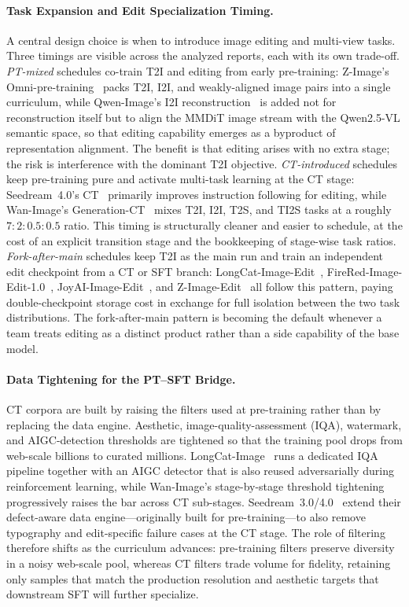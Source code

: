 \documentclass{llmxive}
\begin{document}
\paragraph{Task Expansion and Edit Specialization Timing.}
{A central design choice is when to introduce image editing and multi-view tasks. Three timings are visible across the analyzed reports, each with its own trade-off. \textit{PT-mixed} schedules co-train T2I and editing from early pre-training: Z-Image's Omni-pre-training~\citep{cai2025z} packs T2I, I2I, and weakly-aligned image pairs into a single curriculum, while Qwen-Image's I2I reconstruction~\citep{wu2025qwen} is added not for reconstruction itself but to align the MMDiT image stream with the Qwen2.5-VL semantic space, so that editing capability emerges as a byproduct of representation alignment. The benefit is that editing arises with no extra stage; the risk is interference with the dominant T2I objective. \textit{CT-introduced} schedules keep pre-training pure and activate multi-task learning at the CT stage: Seedream~4.0's CT~\citep{seedream2025seedream} primarily improves instruction following for editing, while Wan-Image's Generation-CT~\citep{mao2026wan} mixes T2I, I2I, T2S, and TI2S tasks at a roughly $7{:}2{:}0.5{:}0.5$ ratio. This timing is structurally cleaner and easier to schedule, at the cost of an explicit transition stage and the bookkeeping of stage-wise task ratios. \textit{Fork-after-main} schedules keep T2I as the main run and train an independent edit checkpoint from a CT or SFT branch: LongCat-Image-Edit~\citep{team2025longcat}, FireRed-Image-Edit-1.0~\citep{team2026firered}, JoyAI-Image-Edit~\citep{jdjoyaiimage}, and Z-Image-Edit~\citep{cai2025z} all follow this pattern, paying double-checkpoint storage cost in exchange for full isolation between the two task distributions. The fork-after-main pattern is becoming the default whenever a team treats editing as a distinct product rather than a side capability of the base model.}

\paragraph{Data Tightening for the PT--SFT Bridge.}
{CT corpora are built by raising the filters used at pre-training rather than by replacing the data engine. Aesthetic, image-quality-assessment (IQA), watermark, and AIGC-detection thresholds are tightened so that the training pool drops from web-scale billions to curated millions. LongCat-Image~\citep{team2025longcat} runs a dedicated IQA pipeline together with an AIGC detector that is also reused adversarially during reinforcement learning, while Wan-Image's stage-by-stage threshold tightening~\citep{mao2026wan} progressively raises the bar across CT sub-stages. Seedream~3.0/4.0~\citep{gao2025seedream,seedream2025seedream} extend their defect-aware data engine---originally built for pre-training---to also remove typography and edit-specific failure cases at the CT stage. The role of filtering therefore shifts as the curriculum advances: pre-training filters preserve diversity in a noisy web-scale pool, whereas CT filters trade volume for fidelity, retaining only samples that match the production resolution and aesthetic targets that downstream SFT will further specialize.}
\end{document}
